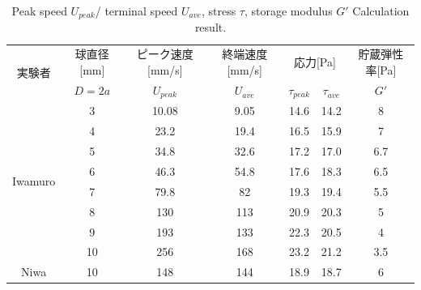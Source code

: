 \begin{table}[hbtp]
    \caption{Peak speed $U_{peak}$/ terminal speed $U_{ave}$, stress $\tau$, storage modulus $G'$ Calculation result.}
    \label{table:iwamuro}
    \centering
    \begin{tabular}{ccccccc}
        \hline
        \multirow{2}{*}{実験者}  & 球直径[mm] & ピーク速度[mm/s] & 終端速度[mm/s] & \multicolumn{2}{c}{応力[Pa]} & 貯蔵弾性率[Pa]        \\
                                 & $D=2a$     & $U_{peak}$       & $U_{ave}$      & $\tau_{peak}$                & $\tau_{ave}$   & $G'$ \\
        \hline \hline
        \multirow{8}{*}{Iwamuro} & 3          & 10.08            & 9.05           & 14.6                         & 14.2           & 8    \\
                                 & 4          & 23.2             & 19.4           & 16.5                         & 15.9           & 7    \\
                                 & 5          & 34.8             & 32.6           & 17.2                         & 17.0           & 6.7  \\
                                 & 6          & 46.3             & 54.8           & 17.6                         & 18.3           & 6.5  \\
                                 & 7          & 79.8             & 82             & 19.3                         & 19.4           & 5.5  \\
                                 & 8          & 130              & 113            & 20.9                         & 20.3           & 5    \\
                                 & 9          & 193              & 133            & 22.3                         & 20.5           & 4    \\
                                 & 10         & 256              & 168            & 23.2                         & 21.2           & 3.5  \\
        \hline \hline
        Niwa                     & 10         & 148              & 144            & 18.9                         & 18.7           & 6    \\
        \hline
    \end{tabular}
\end{table}
